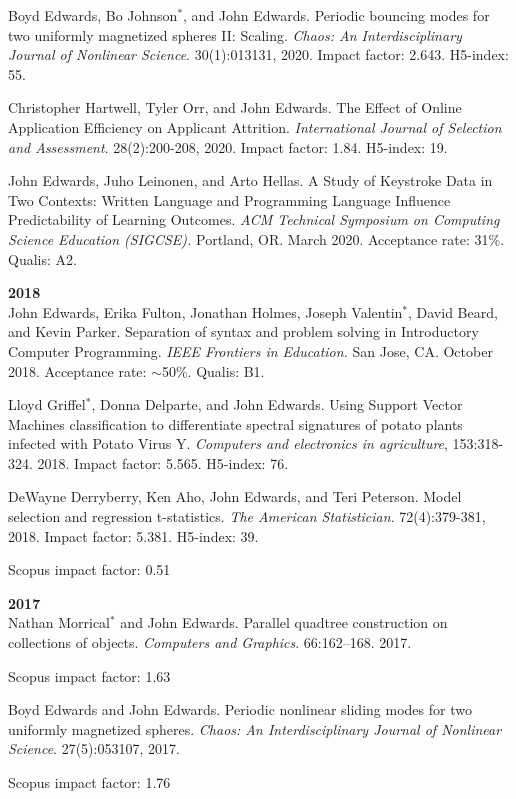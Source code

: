 \documentclass[margin,line]{res}
\newcommand{\pubunder}[1]{#1}
\begin{document}
\begin{resume}
Boyd Edwards, Bo Johnson$^*$, and \pubunder{John Edwards}. Periodic bouncing modes for two uniformly magnetized spheres II: Scaling. \textit{Chaos: An Interdisciplinary Journal of Nonlinear Science}. 30(1):013131, 2020. Impact factor: 2.643. H5-index: 55. 

Christopher Hartwell, Tyler Orr, and \pubunder{John Edwards}. The Effect of Online Application Efficiency on Applicant Attrition. \textit{International Journal of Selection and Assessment}. 28(2):200-208, 2020. Impact factor: 1.84. H5-index: 19.

John Edwards, Juho Leinonen, and Arto Hellas. A Study of Keystroke Data in Two Contexts: Written Language and Programming Language Influence Predictability of Learning Outcomes.  \textit{ACM Technical Symposium on Computing Science Education (SIGCSE).} Portland, OR. March 2020.  Acceptance rate: 31\%. Qualis: A2.

\textbf{2018} \\
John Edwards, Erika Fulton, Jonathan Holmes, Joseph Valentin$^*$, David Beard, and Kevin Parker. Separation of syntax and problem solving in Introductory Computer Programming. \textit{IEEE Frontiers in Education.} San Jose, CA. October 2018.  Acceptance rate: $\sim$50\%. Qualis: B1.

Lloyd Griffel$^*$, Donna Delparte, and John Edwards. Using Support Vector Machines classification to differentiate spectral signatures of potato plants infected with Potato Virus Y. \textit{Computers and electronics in agriculture}, 153:318-324. 2018. Impact factor: 5.565. H5-index: 76.

DeWayne Derryberry, Ken Aho, \pubunder{John Edwards}, and Teri Peterson. Model selection and regression t-statistics. \textit{The American Statistician}. 72(4):379-381, 2018. Impact factor: 5.381. H5-index: 39.
\begin{IMPACT}
Scopus impact factor: 0.51 %
\end{IMPACT}

\textbf{2017} \\
Nathan Morrical$^*$ and \pubunder{John Edwards}. Parallel quadtree construction on collections of objects. \textit{Computers and Graphics}. 66:162–168. 2017.
\begin{IMPACT}
Scopus impact factor: 1.63 %
\end{IMPACT}

Boyd Edwards and \pubunder{John Edwards}. Periodic nonlinear sliding modes for two uniformly magnetized spheres. \textit{Chaos: An Interdisciplinary Journal of Nonlinear Science}. 27(5):053107, 2017.
\begin{IMPACT}
Scopus impact factor: 1.76 %
\end{IMPACT}


\end{resume}
\end{document}
